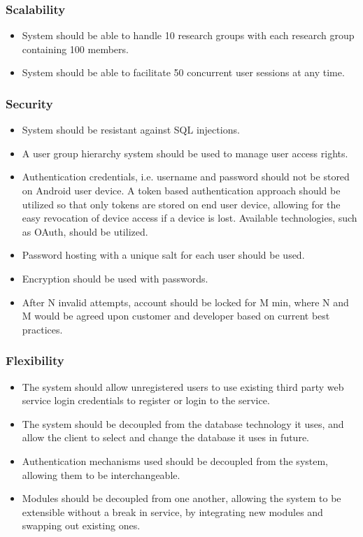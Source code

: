\documentclass[a4paper,10pt]{article}
\begin{document}
\subsubsection{Scalability}
\begin{itemize}
\item System should be able to handle 10 research groups with each research group containing 100 members.
\item System should be able to facilitate 50 concurrent user sessions at any time.
\end{itemize}

\subsubsection{Security}
\begin{itemize}
\item System should be resistant against SQL injections.
\item A user group hierarchy system should be used to manage user access rights.
\item Authentication credentials, i.e. username and password should not be stored on Android user device. A token based authentication approach should be utilized so that only tokens are stored on end user device, allowing for the easy revocation of device access if a device is lost. Available technologies, such as OAuth, should be utilized.
\item Password hosting with a unique salt for each user should be used.
\item Encryption should be used with passwords.
\item After N invalid attempts, account should be locked for M min, where N and M would be agreed upon customer and developer based on current best practices.
\end{itemize}

\subsubsection{Flexibility}
\begin{itemize}
\item The system should allow unregistered users to use existing third party web service login credentials to register or login to the service.
\item The system should be decoupled from the database technology it uses, and allow the client to select and change the database it uses in future.
\item Authentication mechanisms used should be decoupled from the system, allowing them to be interchangeable.
\item Modules should be decoupled from one another, allowing the system to be extensible without a break in service, by integrating new modules and swapping out existing ones. 
\end{itemize}
\end{document}
